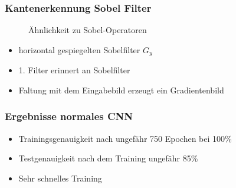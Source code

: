 \documentclass{beamer}
\begin{document}
\begin{frame}
	\frametitle{Kantenerkennung Sobel Filter}
	\begin{figure}
		\centering
		\caption{Ähnlichkeit zu Sobel-Operatoren}
		\label{fig:sobel}
	\end{figure}
	\begin{itemize}
		\item horizontal gespiegelten Sobelfilter $G_y$  
		\item 1. Filter erinnert an Sobelfilter
		\item Faltung mit dem Eingabebild erzeugt ein Gradientenbild
	\end{itemize}
\end{frame}

\begin{frame}
	\frametitle{Ergebnisse normales CNN}
	\begin{figure}
		\label{fig:conv_results}
	\end{figure}
	\begin{itemize}
		\item Trainingsgenauigkeit nach ungefähr 750 Epochen bei 100\%
		\item Testgenauigkeit nach dem Training ungefähr 85\%
		\item Sehr schnelles Training
	\end{itemize}
\end{frame}
\end{document}
